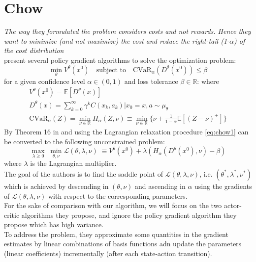 \section{Chow}
\textit{The way they formulated the problem considers costs and not rewards. Hence they want to minimize
(and not maximize) the cost and reduce the right-tail (1-$\alpha$) of the cost distribution }\\
\citet{Chow2014} present several policy gradient algorithms to solve the optimization problem:
\begin{equation}
    \underset{\theta}\min V^\theta(x^0) \quad \text{subject to} \quad \text{CVaR}_\alpha(D^\theta(x^0)) \leq \beta
\end{equation}
for a given confidence level $\alpha \in(0,1)$ and loss tolerance $\beta \in \mathbb R$:
where 
\begin{align}
    V^\theta(x^0) = \mathbb E [D^\theta(x)]\\
    D^\theta(x)=\sum_{k=0}^\infty \gamma^k C(x_k,a_k) | x_0=x, a\sim \mu_\theta\\
    \text{CVaR}_\alpha(Z)=\underset{\nu\in\mathbb{R} }\min H_\alpha(Z,\nu)\equiv \underset{\nu\in\mathbb{R}}\min\{ \nu + \frac{1}{1-\alpha}\mathbb E[(Z-\nu)^+]\} \label{eq:chow1}
\end{align}
By Theorem 16 in \citet{Rockafellar2002} and using the Lagrangian relaxation procedure 
\citep{Bertsekas_nonlinear} \ref{eq:chow1} can be converted to the following unconstrained problem:
\begin{equation}
    \underset{\lambda\geq0}\max \; \underset{\theta,\nu}\min \mathcal{L}(\theta,\lambda,\nu) \;\equiv
     V^\theta(x^0) + \lambda (H_\alpha (D^\theta(x^0),\nu)-\beta)
\end{equation}
where $\lambda$ is the Lagrangian multiplier.\\
The goal of the authors is to find the saddle point of $ \mathcal{L}(\theta,\lambda,\nu)$, i.e. $(\theta^*,\lambda^*,\nu^*)$ which is achieved by
descending in $(\theta, \nu)$ and ascending in $\alpha$ using the gradients of  $\mathcal{L}(\theta,\lambda,\nu)$ with respect to 
the corresponding parameters.\\
For the sake of comparison with our algorithm, we will focus on the two actor-critic algorithms
they propose, and ignore the policy gradient algorithm they propose which has high variance.\\
To address the problem, they approximate some quantities in the gradient estimates by 
linear combinations of basis functions adn update the parameters (linear coefficients)
incrementally (after each state-action transition).

